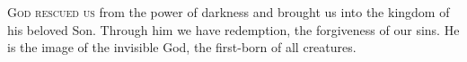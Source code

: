 
\lettrine{G}{od rescued us} from the power of darkness and brought us
into the kingdom of his beloved Son. Through him we have redemption,
the forgiveness of our sins. He is the image of the invisible
God, the first-born of all creatures.
